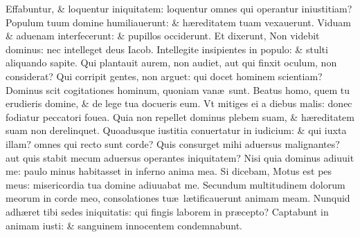 \documentclass[a5paper,10pt]{book}
\def\ae{æ}
\begin{document}
\begin{multicols*}{2}
\newline \color{red} E\color{black}ffabuntur, \& loquentur iniquitatem: loquentur omnes qui operantur iniustitiam?
\newline \color{red} P\color{black}opulum tuum domine humiliauerunt: \& h\ae reditatem tuam vexauerunt.
\newline \color{red} V\color{black}iduam \& aduenam interfecerunt: \& pupillos occiderunt.
\newline \color{red} E\color{black}t dixerunt, Non videbit dominus: nec intelleget deus Iacob.
\newline \color{red} I\color{black}ntellegite insipientes in populo: \& stulti aliquando sapite.
\newline \color{red} Q\color{black}ui plantauit aurem, non audiet, aut qui finxit oculum, non considerat?
\newline \color{red} Q\color{black}ui corripit gentes, non arguet: qui docet hominem scientiam?
\newline \color{red} D\color{black}ominus scit cogitationes hominum, quoniam van\ae \ sunt.
\newline \color{red} B\color{black}eatus homo, quem tu erudieris domine, \& de lege tua docueris eum.
\newline \color{red} V\color{black}t mitiges ei a diebus malis: donec fodiatur peccatori fouea.
\newline \color{red} Q\color{black}uia non repellet dominus plebem suam, \& h\ae reditatem suam non derelinquet.
\newline \color{red} Q\color{black}uoadusque iustitia conuertatur in iudicium: \& qui iuxta illam? omnes qui recto sunt corde?
\newline \color{red} Q\color{black}uis consurget mihi aduersus malignantes? aut quis stabit mecum aduersus operantes iniquitatem?
\newline \color{red} N\color{black}isi quia dominus adiuuit me: paulo minus habitasset in inferno anima mea.
\newline \color{red} S\color{black}i dicebam, Motus est pes meus: misericordia tua domine adiuuabat me.
\newline \color{red} S\color{black}ecundum multitudinem dolorum meorum in corde meo, consolationes tu\ae \ l\ae tificauerunt animam meam.
\newline \color{red} N\color{black}unquid adh\ae ret tibi sedes iniquitatis: qui fingis laborem in pr\ae cepto?
\newline \color{red} C\color{black}aptabunt in animam iusti: \& sanguinem innocentem condemnabunt.

\end{multicols*}
\end{document}
